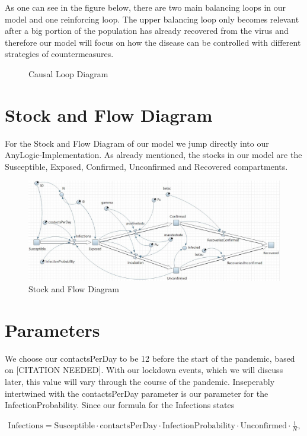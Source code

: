\documentclass
[
    a4paper,
    11pt,
    bibliography = totoc,
    listof = totoc,
    headinclude = true,
]
{scrreprt}
\begin{document}
As one can see in the figure below, there are two main balancing loops
in our model and one reinforcing loop. The upper balancing loop only
becomes relevant after a big portion of the population has already recovered
from the virus and therefore our model will focus on how the disease can
be controlled with different strategies of countermeasures.

\begin{figure}[hbt!]
  \caption{Causal Loop Diagram}
  
\end{figure}

\section{Stock and Flow Diagram}

For the Stock and Flow Diagram of our model we jump directly into
our AnyLogic-Implementation. As already mentioned, the stocks in our model
are the Susceptible, Exposed, Confirmed, Unconfirmed and Recovered compartments.

\begin{figure}[hbt!]
  \caption{Stock and Flow Diagram}
  \includegraphics[width=\linewidth]{../AnyLogicSIR.JPG}
\end{figure}

\FloatBarrier

\section{Parameters}

We choose our contactsPerDay to be 12 before the start of the pandemic,
based on [CITATION NEEDED]. With our lockdown events, which we will discuss
later, this value will vary through the course of the pandemic.
Inseperably intertwined with the contactsPerDay parameter is our parameter
for the InfectionProbability. Since our formula for the Infections states

\begin{align*}
  \text{Infections} = \text{Susceptible} \cdot \text{contactsPerDay} \cdot
  \text{InfectionProbability} \cdot
  \text{Unconfirmed} \cdot \frac{1}{N},
\end{align*}
\end{document}
